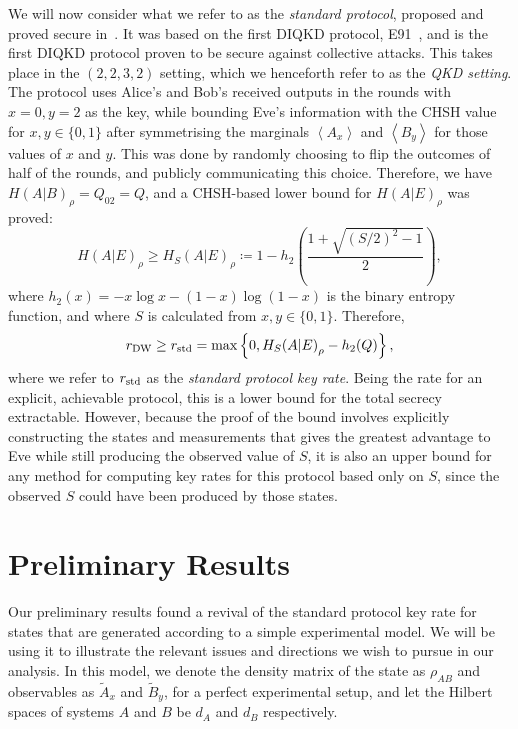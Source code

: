 \documentclass[10pt, a4paper]{article}
\numberwithin{equation}{section} %
\theoremstyle{definition}
\theoremstyle{plain}
\newcommand{\?}{\mathrel{?}} %
\newcommand{\angleb}[1]{\left\langle #1 \right\rangle} %
\newcommand{\DW}{\rm DW}
\newcommand{\std}{\rm std}
\begin{document}
    We will now consider what we refer to as the \emph{standard protocol}, proposed and proved secure in~\cite{DIQKD_Lower}. It was based on the first DIQKD protocol, E91~\cite{E91}, and is the first DIQKD protocol proven to be secure against collective attacks. This takes place in the \((2,2,3,2)\) setting, which we henceforth refer to as the \emph{QKD setting}. The protocol uses Alice's and Bob's received outputs in the rounds with \(x = 0, y = 2\) as the key, while bounding Eve's information with the CHSH value for \(x,y \in \{0,1\}\) after symmetrising the marginals \(\angleb{A_x}\) and \(\angleb{B_y}\) for those values of \(x\) and \(y\). This was done by randomly choosing to flip the outcomes of half of the rounds, and publicly communicating this choice. Therefore, we have \({H(A|B)}_{\rho} = Q_{02} = Q\), and a CHSH-based lower bound for \({H(A|E)}_{\rho}\) was proved:
    \begin{equation}
      {H(A|E)}_{\rho} \geq {H_S(A|E)}_{\rho} \coloneqq 1 - h_2\left( \frac{1 + \sqrt{{(S/2)}^2-1}}{2} \right),
    \end{equation}
    where \(h_2(x) = - x \log x - (1-x) \log (1-x)\) is the binary entropy function, and where \(S\) is calculated from \(x,y \in \{0,1\}\). Therefore,
    \begin{equation}
      r_{\DW} \geq r_{\std} = \max \left\{ 0, {H_S(A|E)}_{\rho} - h_2(Q) \right\},
    \end{equation}
    where we refer to \(r_{\std}\) as the \emph{standard protocol key rate}. Being the rate for an explicit, achievable protocol, this is a lower bound for the total secrecy extractable. However, because the proof of the bound involves explicitly constructing the states and measurements that gives the greatest advantage to Eve while still producing the observed value of \(S\), it is also an upper bound for any method for computing key rates for this protocol based only on \(S\), since the observed \(S\) could have been produced by those states.

    \section{Preliminary Results}\label{sec:preres}

    Our preliminary results found a revival of the standard protocol key rate for states that are generated according to a simple experimental model. We will be using it to illustrate the relevant issues and directions we wish to pursue in our analysis. In this model, we denote the density matrix of the state as \(\rho_{AB}\) and observables as \(\tilde{A}_x\) and \(\tilde{B}_y\), for a perfect experimental setup, and let the Hilbert spaces of systems \(A\) and \(B\) be \(d_A\) and \(d_B\) respectively.
\end{document}
